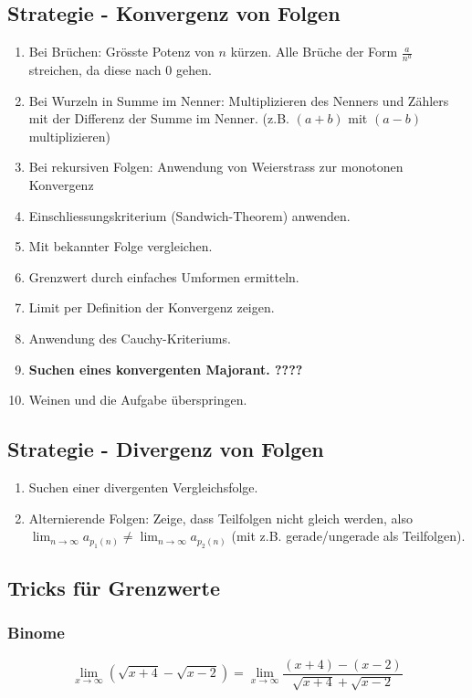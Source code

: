 \documentclass[a4paper,fontsize = 7pt]{scrartcl}
\def\limn{\lim_{n\to \infty}}
\begin{document}
\subsection{Strategie - Konvergenz von Folgen}
\begin{enumerate}
 \item Bei Brüchen: Grösste Potenz von $n$ kürzen. Alle Brüche der Form $\frac{a}{n^a}$ streichen, da diese nach 0 gehen.
 \item Bei Wurzeln in Summe im Nenner: Multiplizieren des Nenners und Zählers mit der Differenz der Summe im Nenner. (z.B. $(a+b)$ mit $(a-b)$ multiplizieren)
 \item Bei rekursiven Folgen: Anwendung von Weierstrass zur monotonen Konvergenz
 \item Einschliessungskriterium (Sandwich-Theorem) anwenden.
 \item Mit bekannter Folge vergleichen.
 \item Grenzwert durch einfaches Umformen ermitteln.
 \item Limit per Definition der Konvergenz zeigen.
 \item Anwendung des Cauchy-Kriteriums.
 \item \textbf{Suchen eines konvergenten Majorant. ????}
 \item Weinen und die Aufgabe überspringen.
\end{enumerate}

\subsection{Strategie - Divergenz von Folgen}
\begin{enumerate}
 \item Suchen einer divergenten Vergleichsfolge.
 \item Alternierende Folgen: Zeige, dass Teilfolgen nicht gleich werden, also $\limn a_{p_1(n)} \ne \limn a_{p_2(n)}$ (mit z.B. gerade/ungerade als Teilfolgen).
\end{enumerate}

\subsection{Tricks für Grenzwerte}
\subsubsection{Binome}
$$\lim_{x\to\infty} (\sqrt{x + 4} - \sqrt{x - 2}) = \lim_{x\to\infty} \frac{(x+4)-(x-2)}{\sqrt{x+4}+\sqrt{x-2}}$$
\end{document}
